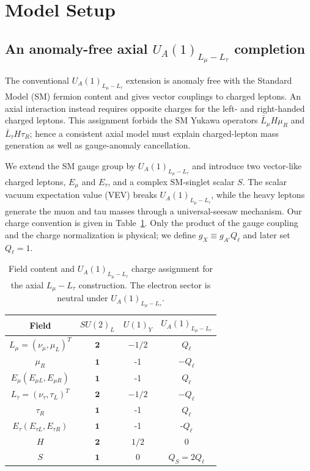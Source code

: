 \documentclass[onecolumn, aps, nofootinbib, prd, preprint, floats, floatfix, amsmath, amssymb, superscriptaddress, preprintnumbers]{revtex4-2}
\begin{document}
\section{Model Setup}
\label{sec:model-setup}

\subsection{An anomaly-free axial $U_A(1)_{L_\mu-L_\tau}$ completion}

The conventional $U_A(1)_{L_\mu-L_\tau}$ extension is anomaly free with the
Standard Model (SM) fermion content and gives vector couplings to charged
leptons.  An axial interaction instead requires opposite charges for the
left- and right-handed charged leptons.  This assignment forbids the SM
Yukawa operators $\bar L_\mu H\mu_R$ and $\bar L_\tau H\tau_R$; hence a
consistent axial model must explain charged-lepton mass generation as well as
gauge-anomaly cancellation.

We extend the SM gauge group by $
U_A(1)_{L_\mu-L_\tau}$ and introduce two vector-like charged leptons,
$E_\mu$ and $E_\tau$, and a complex SM-singlet scalar $S$.  The scalar vacuum
expectation value (VEV) breaks $U_A(1)_{L_\mu-L_\tau}$, while the heavy leptons generate the
muon and tau masses through a universal-seesaw mechanism.  Our charge
convention is given in Table~\ref{tab:charge-assignment}.  Only the product of
the gauge coupling and the charge normalization is physical; we define
$g_X\equiv g_{A'}Q_\ell$ and later set $Q_\ell=1$.

\begin{table}[htbp]
    \centering
    \begin{tabular}{cccc}
    \hline
    Field & $SU(2)_L$ & $U(1)_Y$ & $U_A(1)_{L_\mu-L_\tau}$ \\
    \hline
    $L_{\mu}=\left(\nu_{\mu}, \mu_L\right)^T$ & $\mathbf{2}$ & $-1 / 2$ & $Q_{\ell}$ \\
    \hline
    $\mu_R$ & $\mathbf{1}$ & -1 & $-Q_\ell$ \\
    \hline
    $E_\mu\left(E_{\mu L}, E_{\mu R}\right)$ & $\mathbf{1}$ & -1 & $Q_\ell$\\
    \hline
    $L_{\tau}=\left(\nu_{\tau}, \tau_L\right)^T$ & $\mathbf{2}$ & $-1 / 2$ & $-Q_\ell$ \\
    \hline
    $\tau_R$ & $\mathbf{1}$ & -1 & $Q_\ell$ \\
    \hline
    $E_\tau\left(E_{\tau L}, E_{\tau R}\right)$ & $\mathbf{1}$ & -1 & -$Q_\ell$\\
    \hline
    $H$ & $\mathbf{2}$ & $1 / 2$ & 0 \\
    $S$ & $\mathbf{1}$ & 0 & $Q_S=2Q_\ell$\\
    \hline
    \end{tabular}
    \caption{Field content and $U_A(1)_{L_\mu-L_\tau}$ charge assignment for the axial $L_\mu-L_\tau$ construction. The electron sector is neutral under $U_A(1)_{L_\mu-L_\tau}$.}
    \label{tab:charge-assignment}
\end{table}
\end{document}
